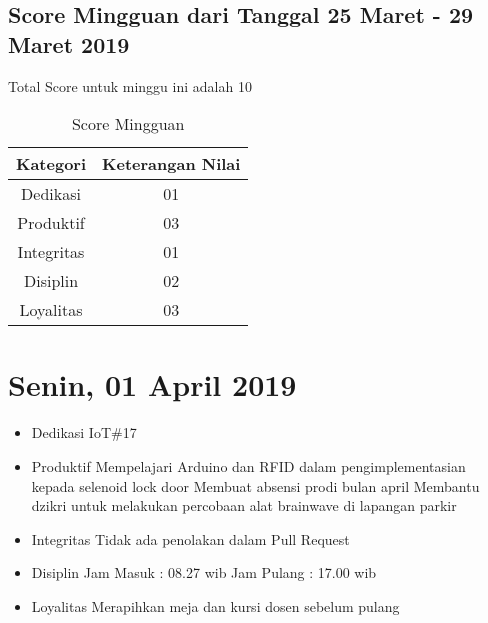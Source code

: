 \subsection{Score Mingguan dari Tanggal 25 Maret - 29 Maret 2019}
Total Score untuk minggu ini adalah 10

\begin{table}[h]
\caption{Score Mingguan}
\centering
\begin{tabular}{|c|c|}
\hline
\textbf{Kategori}&\textbf{Keterangan Nilai}\\
\hline
Dedikasi&01\\
\hline
Produktif&03\\
\hline
Integritas&01\\
\hline
Disiplin&02\\
\hline
Loyalitas&03\\
\hline
\end{tabular}
\label{table:score mingguan}
\end{table}

\section{Senin, 01 April 2019}
\begin{itemize}
\item Dedikasi
\subitem IoT\#17
\item Produktif
  \subitem Mempelajari Arduino dan RFID dalam pengimplementasian kepada selenoid lock door
  \subitem Membuat absensi prodi bulan april
  \subitem Membantu dzikri untuk melakukan percobaan alat brainwave di lapangan parkir
\item Integritas
  \subitem Tidak ada penolakan dalam Pull Request
\item Disiplin
  \subitem Jam Masuk : 08.27 wib
  \subitem Jam Pulang : 17.00 wib
\item Loyalitas
  \subitem Merapihkan meja dan kursi dosen sebelum pulang
\end{itemize}